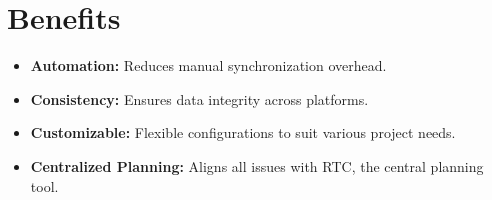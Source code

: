 \section{Benefits}

\begin{itemize}
    \item \textbf{Automation:} Reduces manual synchronization overhead.
    \item \textbf{Consistency:} Ensures data integrity across platforms.
    \item \textbf{Customizable:} Flexible configurations to suit various project 
          needs.
    \item \textbf{Centralized Planning:} Aligns all issues with RTC, the central 
          planning tool.
\end{itemize}